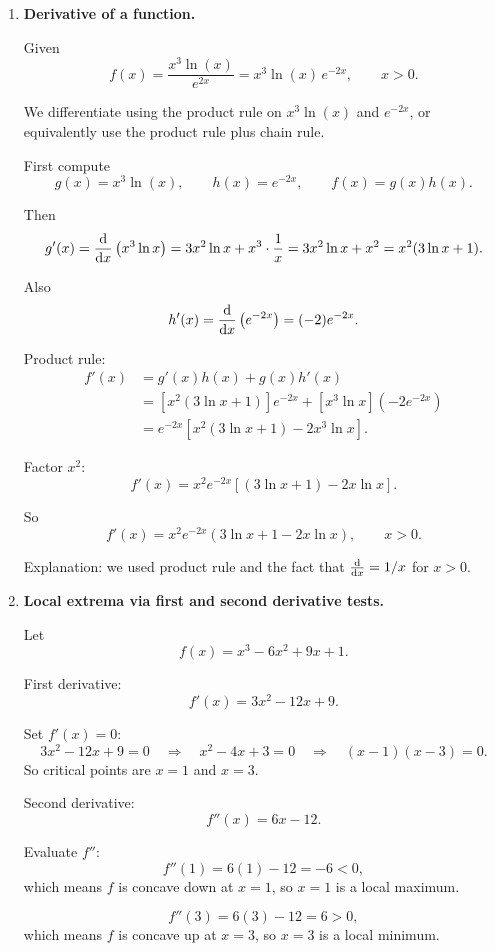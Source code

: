\documentclass[12pt]{article}
\begin{document}
\begin{enumerate}
Interpretation: this is the area under the straight line $2x+3$ between $x=1$ and $x=4$.


\item \textbf{Derivative of a function.}

Given
\[
  f(x) = \frac{x^3 \ln(x)}{e^{2x}} = x^3 \ln(x)\, e^{-2x}, \qquad x>0.
\]

We differentiate using the product rule on $x^3 \ln(x)$ and $e^{-2x}$, or equivalently use the product rule plus chain rule.

First compute
\[
g(x) = x^3 \ln(x), \qquad h(x) = e^{-2x}, \qquad f(x)=g(x)h(x).
\]

Then
\[
  g'(x) = \dv{x} \left( x^3 \ln x \right)
  = 3x^2 \ln x + x^3 \cdot \frac{1}{x}
  = 3x^2 \ln x + x^2
  = x^2 (3\ln x + 1).
\]

Also
\[
  h'(x) = \dv{x}\left(e^{-2x}\right) = (-2)e^{-2x}.
\]

Product rule:
\begin{align*}
f'(x)
&= g'(x)h(x) + g(x)h'(x) \\
&= \left[x^2 (3\ln x + 1)\right] e^{-2x} + \left[x^3 \ln x\right] (-2 e^{-2x}) \\
&= e^{-2x} \left[ x^2 (3\ln x + 1) - 2 x^3 \ln x \right].
\end{align*}

Factor $x^2$:
\[
f'(x)
= x^2 e^{-2x} \left[ (3\ln x + 1) - 2x \ln x \right].
\]

So
\[
  f'(x) = x^2 e^{-2x} \left( 3\ln x + 1 - 2x \ln x \right), \qquad x>0.
\]

Explanation: we used product rule and the fact that $\dv{}{x}(\ln x)=1/x$ for $x>0$.


\item \textbf{Local extrema via first and second derivative tests.}

Let
\[
  f(x) = x^3 - 6x^2 + 9x + 1.
\]

First derivative:
\[
  f'(x) = 3x^2 -12x + 9.
\]

Set $f'(x)=0$:
\[
  3x^2 -12x + 9 = 0
  \quad\Longrightarrow\quad
  x^2 -4x +3=0
  \quad\Longrightarrow\quad
  (x-1)(x-3)=0.
\]
So critical points are $x=1$ and $x=3$.

Second derivative:
\[
  f''(x) = 6x -12.
\]

Evaluate $f''$:
\[
  f''(1)=6(1)-12 = -6 <0,
\]
which means $f$ is concave down at $x=1$, so $x=1$ is a local maximum.

\[
  f''(3)=6(3)-12 = 6>0,
\]
which means $f$ is concave up at $x=3$, so $x=3$ is a local minimum.


\end{enumerate}
\end{document}
